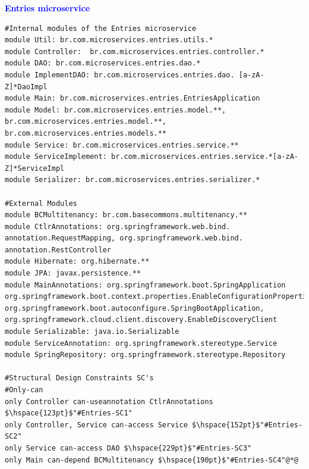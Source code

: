 \documentclass[12pt]{article}
\begin{document}

\noindent\textbf{\large{\textcolor{blue}{Entries microservice}}}
\label{sec:ApendiceEntries}


\begin{lstlisting}[style=colorido, caption={ \textcolor{blue}{Entries microservice's architectural design specification.}},label={list:especArquiteturalEntries}
]
 #Internal modules of the Entries microservice
module Util: br.com.microservices.entries.utils.*
module Controller:  br.com.microservices.entries.controller.*
module DAO: br.com.microservices.entries.dao.*
module ImplementDAO: br.com.microservices.entries.dao. [a-zA-Z]*DaoImpl
module Main: br.com.microservices.entries.EntriesApplication
module Model: br.com.microservices.entries.model.**, br.com.microservices.entries.model.**, br.com.microservices.entries.models.**
module Service: br.com.microservices.entries.service.**
module ServiceImplement: br.com.microservices.entries.service.*[a-zA-Z]*ServiceImpl
module Serializer: br.com.microservices.entries.serializer.*

#External Modules
module BCMultitenancy: br.com.basecommons.multitenancy.**	
module CtlrAnnotations: org.springframework.web.bind. annotation.RequestMapping, org.springframework.web.bind. annotation.RestController
module Hibernate: org.hibernate.**
module JPA: javax.persistence.**
module MainAnnotations: org.springframework.boot.SpringApplication org.springframework.boot.context.properties.EnableConfigurationProperties, org.springframework.boot.autoconfigure.SpringBootApplication, org.springframework.cloud.client.discovery.EnableDiscoveryClient
module Serializable: java.io.Serializable
module ServiceAnnotation: org.springframework.stereotype.Service	
module SpringRepository: org.springframework.stereotype.Repository

#Structural Design Constraints SC's
#Only-can 
only Controller can-useannotation CtlrAnnotations $\hspace{123pt}$"#Entries-SC1"
only Controller, Service can-access Service	$\hspace{152pt}$"#Entries-SC2"
only Service can-access DAO	$\hspace{229pt}$"#Entries-SC3"
only Main can-depend BCMultitenancy $\hspace{190pt}$"#Entries-SC4"@*@


\end{lstlisting}
\end{document}
